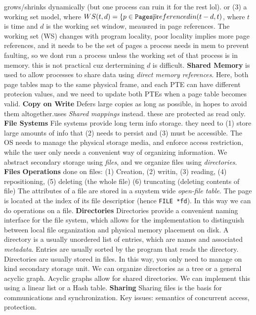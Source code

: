 grows/shrinks dynamically (but one process can ruin it for the rest lol). or
(3) a working set model, where $WS(t,d) = \{ p \in {\tt Pages} \bar p {\text
referenced in } (t-d, t)$, where $t$ is time and $d$ is the working set window,
meausred in page references. The working set (WS) changes with program
locality, poor locality implies more page references, and it needs to be the
set of pages a process needs in mem to prevent faulting, so we dont run a
process unless the working set of that process is in memory. this is not
practical cuz dertermining $d$ is difficult.  {\bf Shared Memory} is used to
allow processes to share data using \emph{direct memory references}.  Here,
both page tables map to the same physical frame, and each PTE can have
different protecion values, and we need to update both PTEs when a page table
becomes valid.
{\bf Copy on Write}
Defers large copies as long as possible, in hopes to avoid them
altogether.uses   \emph{Shared mappings} instead. these are protected as read only.
{\bf File Systems}
File systems provide long term info storage. they need to (1) store large amounts of info that (2) needs to persist and (3) must be accessible.
The OS needs to manage the physical storage media, and enforce access
restriction, while the user only needs a convenient way of organizing
information.
We abstract secondary storage using \emph{files}, and we organize files
using \emph{directories}.
{\bf Files}
{\bf Operations } done on files: (1) Creation, (2) writin, (3) reading, (4) repositioning, (5) deleting (the whole file) (6) truncating (deleting contents of file)
The attributes of a file are stored in a suystem wide \emph{open-file
table}. The page is located at the index of its file descriptior (hence
\texttt{FILE\ *fd}). In this way we can do operations on a file.
{\bf Directories}
Directories provide a convenient naming interface for the file system,
which allows for the implementation to distinguish between local file
organization and physical memory placement on disk.
A directory is a usually unordered list of entries, which are names and
associated \emph{metadata}. Entries are usually sorted by the program
that reads the directory.
Directories are usually stored in files. In this way, you only need to
manage on kind secondary storage unit.
We can organize directories as a tree or a general acyclic graph.
Acyclic graphs allow for shared directories. We can implement this using
a linear list or a Hash table.
{\bf Sharing}
Sharing files is the basis for communications and synchronization.
Key issues: semantics of concurrent access, protection.
